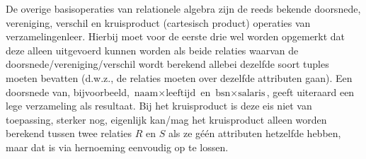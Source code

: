 \begin{aside}
De overige basisoperaties van relationele algebra zijn de reeds bekende doorsnede, vereniging, verschil en kruisproduct (cartesisch product) operaties van verzamelingenleer. Hierbij moet voor de eerste drie wel worden opgemerkt dat deze alleen uitgevoerd kunnen worden als beide relaties waarvan de doorsnede/vereniging/verschil wordt berekend allebei dezelfde soort tuples moeten bevatten (d.w.z., de relaties moeten over dezelfde attributen gaan). Een doorsnede van, bijvoorbeeld, $\text{naam}\times\text{leeftijd}$ en $\text{bsn}\times\text{salaris}$, geeft uiteraard een lege verzameling als resultaat. Bij het kruisproduct is deze eis niet van toepassing, sterker nog, eigenlijk kan/mag het kruisproduct alleen worden berekend tussen twee relaties $R$ en $S$ als ze g\'e\'en attributen hetzelfde hebben, maar dat is via hernoeming eenvoudig op te lossen. 


\end{aside}
